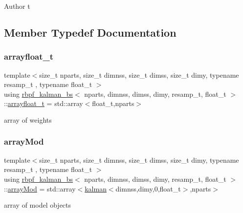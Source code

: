 \begin{DoxyAuthor}{Author}
t 
\end{DoxyAuthor}


\subsection{Member Typedef Documentation}
\mbox{\label{classrbpf__kalman__bs_ae45e5522570234a1126f28fbe6a13c75}} 
\subsubsection{\texorpdfstring{arrayfloat\+\_\+t}{arrayfloat\_t}}
{\footnotesize\ttfamily template$<$size\+\_\+t nparts, size\+\_\+t dimnss, size\+\_\+t dimss, size\+\_\+t dimy, typename resamp\+\_\+t , typename float\+\_\+t $>$ \\
using \hyperlink{classrbpf__kalman__bs}{rbpf\+\_\+kalman\+\_\+bs}$<$ nparts, dimnss, dimss, dimy, resamp\+\_\+t, float\+\_\+t $>$\+::\hyperlink{classrbpf__kalman__bs_ae45e5522570234a1126f28fbe6a13c75}{arrayfloat\+\_\+t} =  std\+::array$<$float\+\_\+t,nparts$>$}

array of weights \mbox{\label{classrbpf__kalman__bs_a009e7dcc39c6a256a6de6ce36df7d033}} 
\subsubsection{\texorpdfstring{array\+Mod}{arrayMod}}
{\footnotesize\ttfamily template$<$size\+\_\+t nparts, size\+\_\+t dimnss, size\+\_\+t dimss, size\+\_\+t dimy, typename resamp\+\_\+t , typename float\+\_\+t $>$ \\
using \hyperlink{classrbpf__kalman__bs}{rbpf\+\_\+kalman\+\_\+bs}$<$ nparts, dimnss, dimss, dimy, resamp\+\_\+t, float\+\_\+t $>$\+::\hyperlink{classrbpf__kalman__bs_a009e7dcc39c6a256a6de6ce36df7d033}{array\+Mod} =  std\+::array$<$\hyperlink{classkalman}{kalman}$<$dimnss,dimy,0,float\+\_\+t$>$,nparts$>$}

array of model objects \mbox{\label{classrbpf__kalman__bs_ae4f4df4fb0cffea207901b0d358a519b}} 
